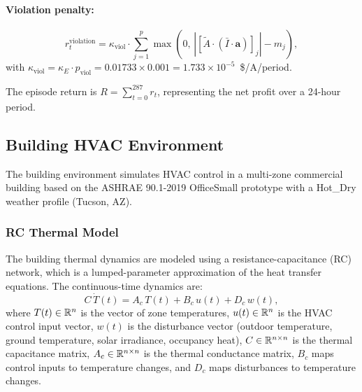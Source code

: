 \paragraph{Violation penalty:}
\begin{equation}
    r_t^{\text{violation}} = \kappa_{\text{viol}} \cdot \sum_{j=1}^{p} \max\!\left(0, \, \left|[\tilde{A} \cdot (\bar{I} \cdot \mathbf{a})]_j\right| - m_j\right),
\end{equation}
with $\kappa_{\text{viol}} = \kappa_E \cdot p_{\text{viol}} = 0.01733 \times 0.001 = 1.733 \times 10^{-5}$~\$/A/period.

The episode return is $R = \sum_{t=0}^{287} r_t$, representing the net profit over a 24-hour period.

\subsection{Building HVAC Environment}
\label{sec:building_env}

The building environment simulates HVAC control in a multi-zone commercial building based on the ASHRAE 90.1-2019 OfficeSmall prototype with a Hot\_Dry weather profile (Tucson, AZ).

\subsubsection{RC Thermal Model}

The building thermal dynamics are modeled using a resistance-capacitance (RC) network, which is a lumped-parameter approximation of the heat transfer equations. The continuous-time dynamics are:
\begin{equation}
    C \, \dot{T}(t) = A_c \, T(t) + B_c \, u(t) + D_c \, w(t),
    \label{eq:building_continuous}
\end{equation}
where $T(t) \in \mathbb{R}^n$ is the vector of zone temperatures, $u(t) \in \mathbb{R}^n$ is the HVAC control input vector, $w(t)$ is the disturbance vector (outdoor temperature, ground temperature, solar irradiance, occupancy heat), $C \in \mathbb{R}^{n \times n}$ is the thermal capacitance matrix, $A_c \in \mathbb{R}^{n \times n}$ is the thermal conductance matrix, $B_c$ maps control inputs to temperature changes, and $D_c$ maps disturbances to temperature changes.

